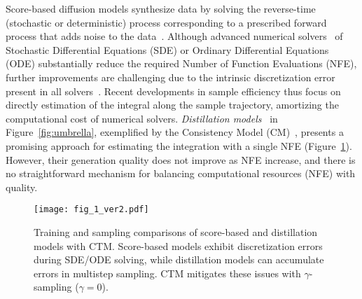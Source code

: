 \documentclass{article} \usepackage{iclr2024_coNFErence,times}
\theoremstyle{definition}
\theoremstyle{remark}
\begin{document}
Score-based diffusion models synthesize data by solving the reverse-time (stochastic or deterministic) process corresponding to a prescribed forward process that adds noise to the data~\citep{song2019generative,song2020score}. Although advanced numerical  solvers~\citep{lu2022dpm, zhang2022fast} of Stochastic Differential Equations (SDE) or Ordinary Differential Equations (ODE) substantially reduce the required Number of Function Evaluations (NFE), 
further improvements are challenging 
due to the intrinsic discretization error present in all solvers~\citep{de2021diffusion}. Recent developments in sample efficiency thus focus on directly  estimation of the integral along the sample trajectory, amortizing the computational cost of numerical solvers.
\emph{Distillation models}~\citep{salimans2021progressive} in Figure~\ref{fig:umbrella}, exemplified by the Consistency Model (CM)~\citep{song2023consistency}, presents a promising approach for estimating the integration with a single NFE (Figure~\ref{fig:i_am_fig_1}). 
However, their generation quality does not improve as NFE increase, and there is no straightforward mechanism for balancing computational resources (NFE) with quality.

\begin{figure}[t]
 \vskip -0.05in
    \centering
    \texttt{[image: fig\_1\_ver2.pdf]}
    \caption{Training and sampling comparisons of score-based and distillation models with CTM. Score-based models exhibit discretization errors during SDE/ODE solving, while distillation models can accumulate errors in multistep sampling. CTM mitigates these issues with $\gamma$-sampling ($\gamma=0$).}
    \label{fig:i_am_fig_1}
    \vskip -0.1in
\end{figure}
\end{document}
